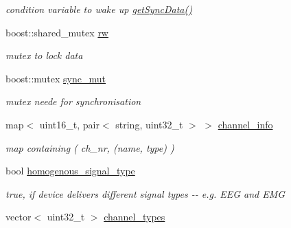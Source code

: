 \begin{DoxyCompactItemize}
\begin{DoxyCompactList}\small\item\em condition variable to wake up \hyperlink{class_h_w_thread_add1215b3e0f06a856330f2debd7ea2fe}{getSyncData()} \item\end{DoxyCompactList}\item 
\hypertarget{class_h_w_thread_a36671c08225d5b48837b15180e281380}{
boost::shared\_\-mutex \hyperlink{class_h_w_thread_a36671c08225d5b48837b15180e281380}{rw}}
\label{class_h_w_thread_a36671c08225d5b48837b15180e281380}

\begin{DoxyCompactList}\small\item\em mutex to lock data \item\end{DoxyCompactList}\item 
\hypertarget{class_h_w_thread_adb37cb4524672b5cd2d56e972924a21d}{
boost::mutex \hyperlink{class_h_w_thread_adb37cb4524672b5cd2d56e972924a21d}{sync\_\-mut}}
\label{class_h_w_thread_adb37cb4524672b5cd2d56e972924a21d}

\begin{DoxyCompactList}\small\item\em mutex neede for synchronisation \item\end{DoxyCompactList}\item 
\hypertarget{class_h_w_thread_a172f41a57b5b15ba8cb4a5be4ec9b37b}{
map$<$ uint16\_\-t, pair$<$ string, uint32\_\-t $>$ $>$ \hyperlink{class_h_w_thread_a172f41a57b5b15ba8cb4a5be4ec9b37b}{channel\_\-info}}
\label{class_h_w_thread_a172f41a57b5b15ba8cb4a5be4ec9b37b}

\begin{DoxyCompactList}\small\item\em map containing ( ch\_\-nr, (name, type) ) \item\end{DoxyCompactList}\item 
\hypertarget{class_h_w_thread_afefba9b22ccf22cd983d5f4e5e0fef67}{
bool \hyperlink{class_h_w_thread_afefba9b22ccf22cd983d5f4e5e0fef67}{homogenous\_\-signal\_\-type}}
\label{class_h_w_thread_afefba9b22ccf22cd983d5f4e5e0fef67}

\begin{DoxyCompactList}\small\item\em true, if device delivers different signal types -\/-\/ e.g. EEG and EMG \item\end{DoxyCompactList}\item 
\hypertarget{class_h_w_thread_ac9ba04fa18cf8a115d282f47a7912a00}{
vector$<$ uint32\_\-t $>$ \hyperlink{class_h_w_thread_ac9ba04fa18cf8a115d282f47a7912a00}{channel\_\-types}}
\label{class_h_w_thread_ac9ba04fa18cf8a115d282f47a7912a00}


\end{DoxyCompactItemize}
